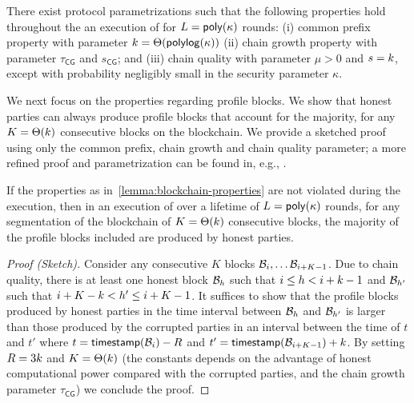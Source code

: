 \begin{lemma} \label{lemma:blockchain-properties}
	There exist protocol parametrizations such that the following properties hold throughout the an execution of \protocFairLedger for $L = \mathsf{poly}(\kappa)$ rounds: (i) common prefix property with parameter $k = \Theta(\mathsf{polylog}(\kappa))$ (ii) chain growth property with parameter $\tau_{\mathsf{CG}}$ and $s_{\mathsf{CG}}$; and (iii) chain quality with parameter $\mu > 0$ and $s = k$, except with probability negligibly small in the security parameter $\kappa$.
\end{lemma}

We next focus on the properties regarding profile blocks.
%
We show that honest parties can always produce profile blocks that account for the majority, for any $K = \Theta(k)$ consecutive blocks on the blockchain.
%
We provide a sketched proof using only the common prefix, chain growth and chain quality parameter; a more refined proof and parametrization can be found in, e.g., \cite{PODC:PasShi17,EC:KiaLeoShe24}.

\begin{lemma}
	\label{lemma:good-profile-blocks}
	If the properties as in~\cref{lemma:blockchain-properties} are not violated during the execution, then in an execution of \protocFairLedger over a lifetime of $L = \mathsf{poly}(\kappa)$ rounds, for any segmentation of the blockchain of $K = \Theta(k)$ consecutive blocks, the majority of the profile blocks included are produced by honest parties.
\end{lemma}


\begin{proof}[Proof (Sketch)]
	Consider any consecutive $K$ blocks $\mathcal{B}_i, \ldots \mathcal{B}_{i + K -1}$.
	Due to chain quality, there is at least one honest block $\mathcal{B}_h$ such that  $i \le h < i + k -1 $ and $\mathcal{B}_{h'}$ such that $i + K - k < h' \le i + K - 1$.
	It suffices to show that the profile blocks produced by honest parties in the time interval between $\mathcal{B}_h$ and $\mathcal{B}_{h'}$ is larger than those produced by the corrupted parties in an interval between the time of $t$ and $t'$ where $t = \mathsf{timestamp}(\mathcal{B}_i) - R$ and $t' = \mathsf{timestamp}(\mathcal{B}_{i + K - 1}) + k$.
	By setting $R = 3k$ and $K = \Theta(k)$ (the constants depends on the advantage of honest computational power compared with the corrupted parties, and the chain growth parameter $\tau_{\mathsf{CG}}$) we conclude the proof.
\end{proof}

